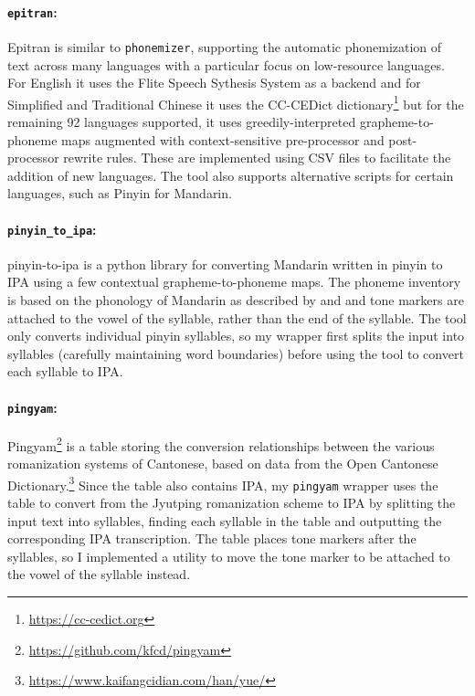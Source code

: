 \paragraph{\texttt{epitran}:}
Epitran \citep{Mortensen-et-al:2018} is similar to \texttt{phonemizer}, supporting the automatic phonemization of text across many languages with a particular focus on low-resource languages. For English it uses the Flite Speech Sythesis System \citep{black2001flite} as a backend and for Simplified and Traditional Chinese it uses the CC-CEDict dictionary\footnote{\url{https://cc-cedict.org}} but for the remaining 92 languages supported, it uses greedily-interpreted grapheme-to-phoneme maps augmented with context-sensitive pre-processor and post-processor rewrite rules. These are implemented using CSV files to facilitate the addition of new languages. The tool also supports alternative scripts for certain languages, such as Pinyin for Mandarin.

\paragraph{\texttt{pinyin\_to\_ipa}:} pinyin-to-ipa \citep{taubert_2024_pinyin-to-ipa_2024} is a python library for converting Mandarin written in pinyin to IPA using a few contextual grapheme-to-phoneme maps. The phoneme inventory is based on the phonology of Mandarin as described by \cite{lin2007sounds} and \cite{duanmu2007phonology} and tone markers are attached to the vowel of the syllable, rather than the end of the syllable. The tool only converts individual pinyin syllables, so my wrapper first splits the input into syllables (carefully maintaining word boundaries) before using the tool to convert each syllable to IPA.

\paragraph{\texttt{pingyam}:} Pingyam\footnote{\url{https://github.com/kfcd/pingyam}} is a table storing the conversion relationships between the various romanization systems of Cantonese, based on data from the Open Cantonese Dictionary.\footnote{\url{https://www.kaifangcidian.com/han/yue/}} Since the table also contains IPA, my \texttt{pingyam} wrapper uses the table to convert from the Jyutping romanization scheme to IPA by splitting the input text into syllables, finding each syllable in the table and outputting the corresponding IPA transcription. The table places tone markers after the syllables, so I implemented a utility to move the tone marker to be attached to the vowel of the syllable instead.

